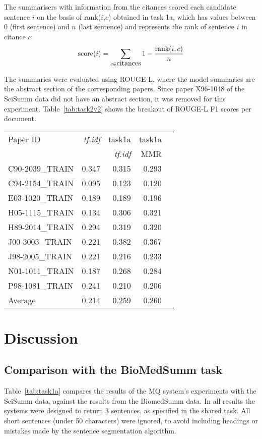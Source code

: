 \documentclass[11pt]{article}
\begin{document}
The summarisers with information from the citances scored each candidate sentence $i$ on the basis of rank($i$,$c$) obtained in task 1a, which has values between 0 (first sentence) and $n$ (last sentence) and represents the rank of sentence $i$ in citance $c$:
$$
\hbox{score}(i) = \sum_{c\in\hbox{citances}}1-\frac{\hbox{rank}(i,c)}{n}
$$

The summaries were evaluated using ROUGE-L, where the model summaries are the abstract section of the corresponding papers. Since paper X96-1048 of the SciSumm data did not have an abstract section, it was removed for this experiment. 
Table~\ref{tab:task2v2} shows the breakout of ROUGE-L F1 scores per document.

\begin{table*}
  \centering
  \begin{tabular}{|l|r|r|r|r|}
  \hline
	Paper ID & \emph{tf.idf} & task1a  & task1a \\
			&	&	\emph{tf.idf}		& MMR \\
	\hline
	C90-2039\_TRAIN & 0.347 & 0.315 & 0.293\\
	C94-2154\_TRAIN & 0.095 & 0.123 & 0.120\\
	E03-1020\_TRAIN & 0.189 & 0.189 & 0.196\\
	H05-1115\_TRAIN & 0.134 & 0.306 & 0.321\\
	H89-2014\_TRAIN & 0.294 & 0.319 & 0.320\\
	J00-3003\_TRAIN & 0.221 & 0.382 & 0.367\\
	J98-2005\_TRAIN & 0.221 & 0.216 & 0.233\\
	N01-1011\_TRAIN & 0.187 & 0.268 & 0.284\\
	P98-1081\_TRAIN & 0.241 & 0.210 & 0.206\\
	\hline
	Average & 0.214 & 0.259 & 0.260 \\
	\hline
  \end{tabular}
  \caption{ROUGE-L F1 results for summaries generated by the MQ system}
  \label{tab:task2v2}
\end{table*}


\section{Discussion}
\subsection{Comparison with the BioMedSumm task}
Table~\ref{tab:task1a} compares the results of the MQ system's experiments with the SciSumm data, against the results from the BiomedSumm data. In all results the systems were designed to return 3 sentences, as specified in the shared task. All short sentences (under 50 characters) were ignored, to avoid including headings or mistakes made by the sentence segmentation algorithm.
\end{document}
